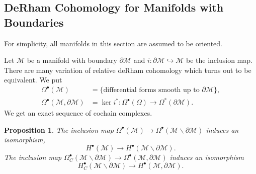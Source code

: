 \documentclass[8pt]{article}
\newtheorem{proposition}{Proposition}[section]
\newcommand{\M}[0]{\mathcal{M}}
\begin{document}
\subsection{DeRham Cohomology for Manifolds with Boundaries}
For simplicity, all manifolds in this section are assumed to be oriented. 
\par Let $\M$ be a manifold with boundary $\partial\M$ and $i:\partial\M\hookrightarrow\M$ be the inclusion map. There are many variation of relative deRham cohomology which turns out to be equivalent. We put 
\begin{align*}
  \Omega^\bullet(\M)&=\{\text{differential forms smooth up to $\partial\M$}\},\\
  \Omega^\bullet(\M,\partial\M)&=\ker i^*:\Omega^\bullet(\Omega)\to\Omega^*(\partial \M).
\end{align*}
We get an exact sequence of cochain complexes.
\begin{center}
\end{center}
\begin{proposition}
  The inclusion map $\Omega^\bullet(\M)\to\Omega^\bullet(\M\backslash\partial\M)$ induces an isomorphism,
  \begin{equation*}
    H^\bullet(\M)\to H^\bullet(\M\backslash\partial\M).
  \end{equation*}
  The inclusion map $\Omega^\bullet_C(\M\backslash\partial\M)\to\Omega^\bullet(\M,\partial\M)$ induces an isomorphism 
  \begin{equation*}
    H^\bullet_C(\M\backslash\partial\M)\to H^\bullet(\M,\partial\M).
  \end{equation*}
\end{proposition}
\end{document}
